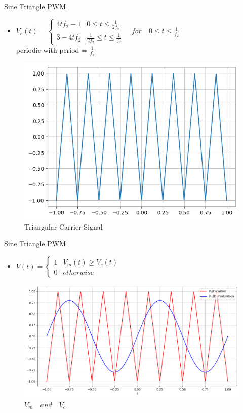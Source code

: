 \documentclass{beamer}
\begin{document}
\begin{frame}{Sine Triangle PWM}
\begin{itemize}
    \item $V_c(t) = \begin{cases}4tf_{2}-1&0\leq t\leq\frac{1}{2f_{2}}\\
    3 - 4tf_2&\frac{1}{2f_2}\leq t\leq\frac{1}{f_{2}}\end{cases} \quad for \quad0\leq t\leq\frac{1}{f_{2}}$\\
    periodic with period = $\frac{1}{f_2}$
\end{itemize}
    \begin{figure}
        \centering
        \includegraphics[width= 0.6\linewidth]{triangle_wave.png}
        \caption{Triangular Carrier Signal}
    \end{figure}
\end{frame}
\begin{frame}{Sine Triangle PWM}
    \begin{itemize}
        \item $V(t) = \begin{cases}
            1&V_m(t) \geq V_c(t)\\
            0& otherwise
        \end{cases}$
    \end{itemize}
    \begin{figure}
        \centering
        \includegraphics[width= 0.7\linewidth]{pwm.png}
        \caption{$V_m\quad and \quad V_c$}
    \end{figure}
\end{frame}
\end{document}
